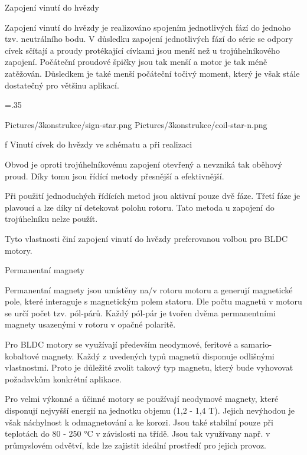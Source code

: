 \secc Zapojení vinutí do hvězdy

Zapojení vinutí do hvězdy je realizováno spojením jednotlivých fází do jednoho tzv. neutrálního bodu.
V důsledku zapojení jednotlivých fází do série se odpory cívek sčítají a proudy protékající cívkami jsou
menší než u trojúhelníkového zapojení. Počáteční proudové špičky jsou tak menší a motor je tak méně zatěžován.
Důsledkem je také menší počáteční točivý moment, který je však stále dostatečný pro většinu aplikací.

\medskip
\picw=.35\hsize
{} %
\centerline {\inspic Pictures/3konstrukce/sign-star.png  \hfil\hfil \inspic Pictures/3konstrukce/coil-star-n.png  }\nobreak
\caption/f Vinutí cívek do hvězdy ve schématu a při realizaci
 \medskip

Obvod je oproti trojúhelníkovému zapojení otevřený a nevzniká tak oběhový proud. Díky tomu jsou řídící metody přesnější a efektivnější.

Při použití jednoduchých řídících metod jsou aktivní pouze dvě fáze. Třetí fáze je plavoucí a 
lze díky ní detekovat polohu rotoru. Tato metoda u zapojení do trojúhelníku nelze použít.

Tyto vlastnosti činí zapojení vinutí do hvězdy preferovanou volbou pro BLDC motory.

 \sec Permanentní magnety

Permanentní magnety jsou umístěny na/v rotoru motoru a generují magnetické pole, které interaguje s magnetickým polem statoru.
Dle počtu magnetů v motoru se určí počet tzv. pól-párů. Každý pól-pár je tvořen dvěma permanentními magnety usazenými v rotoru v opačné polaritě.

Pro BLDC motory se využívají především neodymové, feritové a samario-kobaltové magnety. Každý z uvedených typů magnetů 
disponuje odlišnými vlastnostmi. Proto je důležité zvolit takový typ magnetu, který bude vyhovovat požadavkům konkrétní aplikace.

Pro velmi výkonné a účinné motory se používají neodymové magnety, které disponují nejvyšší energií na jednotku objemu (1,2 - 1,4 T). Jejich nevýhodou je však
 náchylnost k odmagnetování a ke korozi. Jsou také stabilní pouze při teplotách do 80 - 250 °C v závislosti na třídě. Jsou tak využívany 
 např. v průmyslovém odvětví, kde lze zajistit ideální prostředí pro jejich provoz.

